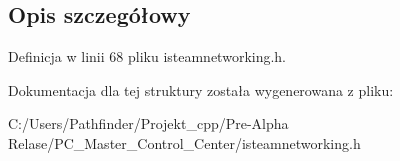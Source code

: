 \subsection{Opis szczegółowy}


Definicja w linii 68 pliku isteamnetworking.\+h.



Dokumentacja dla tej struktury została wygenerowana z pliku\+:\begin{DoxyCompactItemize}
\item 
C\+:/\+Users/\+Pathfinder/\+Projekt\+\_\+cpp/\+Pre-\/\+Alpha Relase/\+P\+C\+\_\+\+Master\+\_\+\+Control\+\_\+\+Center/isteamnetworking.\+h\end{DoxyCompactItemize}
